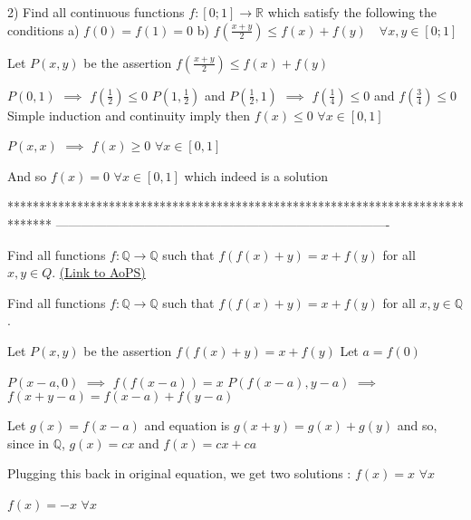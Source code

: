 \begin{solution}
	\begin{tcolorbox}2) Find all continuous functions $f:[0;1]\to\mathbb{R}$  which satisfy the following the conditions
a) $f(0)=f(1)=0$
b) $f\left(\frac{x+y}{2} \right) \leq f(x)+f(y) \quad \forall x,y \in [0;1]$\end{tcolorbox}
Let $P(x,y)$ be the assertion $f(\frac {x+y}2)\le f(x)+f(y)$

$P(0,1)$ $\implies$ $f(\frac 12)\le 0$
$P(1,\frac 12)$ and $P(\frac 12,1)$ $\implies$ $f(\frac 14)\le 0$ and $f(\frac 34)\le 0$
Simple induction and continuity imply then $f(x)\le 0$ $\forall x\in[0,1]$

$P(x,x)$ $\implies$  $f(x)\ge 0$ $\forall x\in[0,1]$

And so $\boxed{f(x)=0}$ $\forall x\in[0,1]$ which indeed is a solution
\end{solution}
*******************************************************************************
-------------------------------------------------------------------------------

\begin{problem}
	Find all functions $f: \mathbb{Q}\to\mathbb{Q}$ such that $f(f(x)+y)=x+f(y)$ for all $x,y{\in}Q$.
	\flushright \href{https://artofproblemsolving.com/community/c6h563635}{(Link to AoPS)}
\end{problem}



\begin{solution}
	\begin{tcolorbox}Find all functions $f: \mathbb{Q}\to\mathbb{Q}$ such that $f(f(x)+y)=x+f(y)$ for all $x,y\in \mathbb{Q}$.\end{tcolorbox}
Let $P(x,y)$ be the assertion $f(f(x)+y)=x+f(y)$
Let $a=f(0)$

$P(x-a,0)$ $\implies$ $f(f(x-a))=x$
$P(f(x-a),y-a)$ $\implies$ $f(x+y-a)=f(x-a)+f(y-a)$

Let $g(x)=f(x-a)$ and equation is $g(x+y)=g(x)+g(y)$ and so, since in $\mathbb Q$, $g(x)=cx$ and $f(x)=cx+ca$

Plugging this back in original equation, we get two solutions :
$\boxed{f(x)=x}$ $\forall x$

$\boxed{f(x)=-x}$ $\forall x$
\end{solution}



